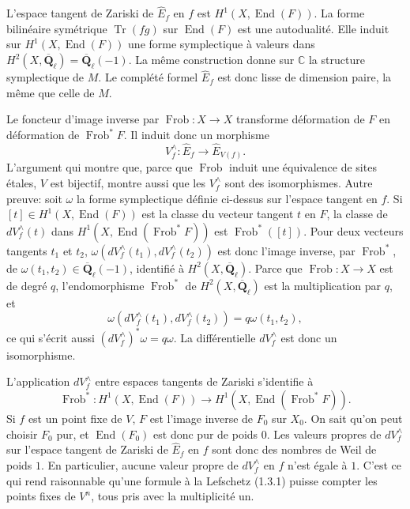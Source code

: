 \documentclass[11pt]{article}
\newcommand{\Qbl}{\overline{\mathbf{Q}}_{\ell}}
\newcommand{\Frob}{\operatorname{Frob}}
\newcommand{\End}{\operatorname{End}}
\newcommand{\Tr}{\operatorname{Tr}}
\begin{document}
L'espace tangent de Zariski de \(\widehat{E}_f\) en \(f\) est \(H^1(X,\End(F))\). La forme bilinéaire symétrique \(\Tr(fg)\) sur \(\End(F)\) est une autodualité. Elle induit sur \(H^1(X,\End(F))\) une forme symplectique à valeurs dans \(H^2(X,\Qbl)=\Qbl(-1)\). La même construction donne sur \(\mathbb{C}\) la structure symplectique de \(M\). Le complété formel \(\widehat{E}_f\) est donc lisse de dimension paire, la même que celle de \(M\).

Le foncteur d'image inverse par \(\Frob:X\to X\) transforme déformation de \(F\) en déformation de \(\Frob^*F\). Il induit donc un morphisme
\[
V_f^{\wedge}:\widehat{E}_f\longrightarrow \widehat{E}_{V(f)}.
\]
L'argument qui montre que, parce que \(\Frob\) induit une équivalence de sites étales, \(V\) est bijectif, montre aussi que les \(V_f^{\wedge}\) sont des isomorphismes. Autre preuve: soit \(\omega\) la forme symplectique définie ci-dessus sur l'espace tangent en \(f\). Si \([t]\in H^1(X,\End(F))\) est la classe du vecteur tangent \(t\) en \(F\), la classe de \(dV_f^{\wedge}(t)\) dans \(H^1(X,\End(\Frob^*F))\) est \(\Frob^*([t])\). Pour deux vecteurs tangents \(t_1\) et \(t_2\), \(\omega(dV_f^{\wedge}(t_1),dV_f^{\wedge}(t_2))\) est donc l'image inverse, par \(\Frob^*\), de \(\omega(t_1,t_2)\in\Qbl(-1)\), identifié à \(H^2(X,\Qbl)\). Parce que \(\Frob:X\to X\) est de degré \(q\), l'endomorphisme \(\Frob^*\) de \(H^2(X,\Qbl)\) est la multiplication par \(q\), et
\[
\omega(dV_f^{\wedge}(t_1),dV_f^{\wedge}(t_2))=q\omega(t_1,t_2),
\]
ce qui s'écrit aussi \((dV_f^{\wedge})^*\omega=q\omega\). La différentielle \(dV_f^{\wedge}\) est donc un isomorphisme.

L'application \(dV_f^{\wedge}\) entre espaces tangents de Zariski s'identifie à
\[
\Frob^*:H^1(X,\End(F))\longrightarrow H^1(X,\End(\Frob^*F)).
\]
Si \(f\) est un point fixe de \(V\), \(F\) est l'image inverse de \(F_0\) sur \(X_0\). On sait qu'on peut choisir \(F_0\) pur, et \(\End(F_0)\) est donc pur de poids \(0\). Les valeurs propres de \(dV_f^{\wedge}\) sur l'espace tangent de Zariski de \(\widehat{E}_f\) en \(f\) sont donc des nombres de Weil de poids \(1\). En particulier, aucune valeur propre de \(dV_f^{\wedge}\) en \(f\) n'est égale à \(1\). C'est ce qui rend raisonnable qu'une formule à la Lefschetz (1.3.1) puisse compter les points fixes de \(V^n\), tous pris avec la multiplicité un.
\end{document}
